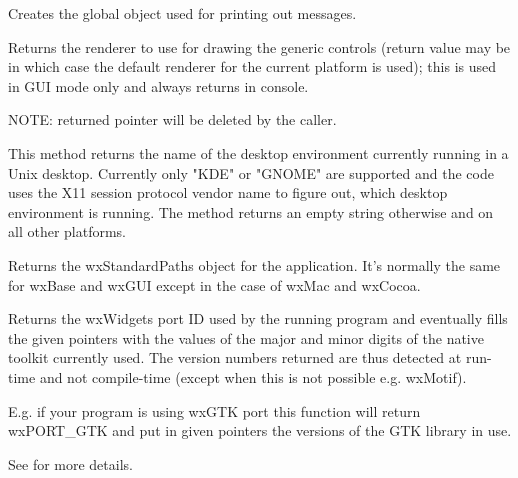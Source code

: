 
Creates the global object used for printing out messages.


\label{wxapptraitscreaterenderer}


Returns the renderer to use for drawing the generic controls (return value may be \NULL
in which case the default renderer for the current platform is used);
this is used in GUI mode only and always returns \NULL in console.

NOTE: returned pointer will be deleted by the caller.

\label{wxapptraitsgetdesktopenvironment}


This method returns the name of the desktop environment currently
running in a Unix desktop. Currently only "KDE" or "GNOME" are
supported and the code uses the X11 session protocol vendor name
to figure out, which desktop environment is running. The method
returns an empty string otherwise and on all other platforms.

\label{wxapptraitsgetstandardpaths}


Returns the wxStandardPaths object for the application.
It's normally the same for wxBase and wxGUI except in the case of wxMac and wxCocoa.

\label{wxapptraitsgettoolkitversion}


Returns the wxWidgets port ID used by the running program and eventually
fills the given pointers with the values of the major and minor digits
of the native toolkit currently used.
The version numbers returned are thus detected at run-time and not compile-time
(except when this is not possible e.g. wxMotif).

E.g. if your program is using wxGTK port this function will return wxPORT\_GTK and
put in given pointers the versions of the GTK library in use.

See  for more details.


